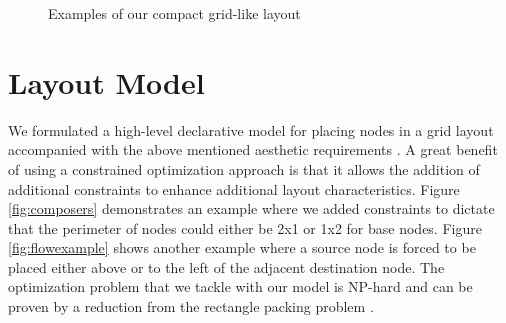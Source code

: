 \documentclass[a4paper,11pt,phdthesis,singlespace,twoside]{cssethesis}
\begin{document}
\begin{figure}
\centering
\hspace*{\fill}%
\hfill%
%
\hspace*{\fill}%
\end{figure}
\begin{figure}
\hspace*{\fill}%
\hfill%
%
\hspace*{\fill}%
\caption{Examples of our compact grid-like layout \cite{Yoghourdjian2015high}}
\label{fig:currentexamples}
\end{figure}


\section{Layout Model}
We formulated a high-level declarative model for placing nodes in a grid layout accompanied with the above mentioned aesthetic requirements \cite{Yoghourdjian2015high}.
A great benefit of using a constrained optimization approach is that it allows the addition of additional constraints to enhance additional layout characteristics. Figure \ref{fig:composers} demonstrates an example where we added constraints to dictate that the perimeter of nodes could either be 2x1 or 1x2 for base nodes. Figure \ref{fig:flowexample} shows another example where a source node is forced to be placed either above or to the left of the adjacent destination node.
The optimization problem that we tackle with our model is NP-hard and can be proven by a reduction from the rectangle packing problem \cite{kojima2007efficient}.
\end{document}
